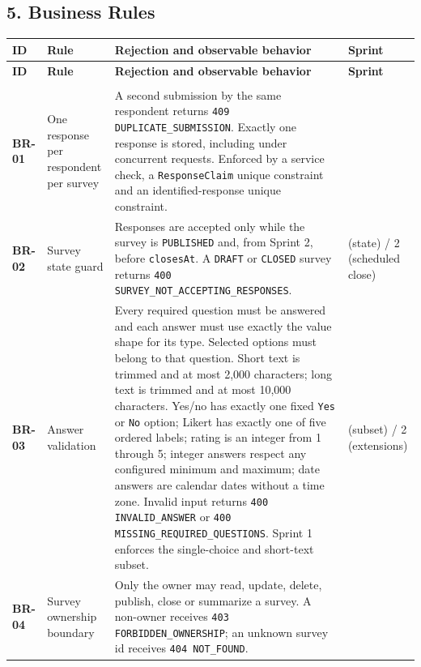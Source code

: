 \documentclass[12pt,a4paper]{article}
\begin{document}
\subsection*{5. Business Rules}
{\setlength{\tabcolsep}{3pt}\renewcommand{\arraystretch}{1.08}\small
\begin{longtable}{@{}>{\raggedright\arraybackslash}p{}>{\raggedright\arraybackslash}p{}>{\raggedright\arraybackslash}p{}>{\raggedright\arraybackslash}p{}@{}}
\toprule
\textbf{ID} & \textbf{Rule} & \textbf{Rejection and observable behavior} & \textbf{Sprint} \\
\midrule
\endfirsthead
\toprule
\textbf{ID} & \textbf{Rule} & \textbf{Rejection and observable behavior} & \textbf{Sprint} \\
\midrule
\endhead
\midrule
\multicolumn{4}{r}{\footnotesize\textit{Continued on next page}}\\
\endfoot
\bottomrule
\endlastfoot
\textbf{BR-01} & One response per respondent per survey & A second submission by the same respondent returns \texttt{409 DUPLICATE\_SUBMISSION}. Exactly one response is stored, including under concurrent requests. Enforced by a service check, a \texttt{ResponseClaim} unique constraint and an identified-response unique constraint. & 1 \\
\textbf{BR-02} & Survey state guard & Responses are accepted only while the survey is \texttt{PUBLISHED} and, from Sprint 2, before \texttt{closesAt}. A \texttt{DRAFT} or \texttt{CLOSED} survey returns \texttt{400 SURVEY\_NOT\_ACCEPTING\_RESPONSES}. & 1 (state) / 2 (scheduled close) \\
\textbf{BR-03} & Answer validation & Every required question must be answered and each answer must use exactly the value shape for its type. Selected options must belong to that question. Short text is trimmed and at most 2,000 characters; long text is trimmed and at most 10,000 characters. Yes/no has exactly one fixed \texttt{Yes} or \texttt{No} option; Likert has exactly one of five ordered labels; rating is an integer from 1 through 5; integer answers respect any configured minimum and maximum; date answers are calendar dates without a time zone. Invalid input returns \texttt{400 INVALID\_ANSWER} or \texttt{400 MISSING\_REQUIRED\_QUESTIONS}. Sprint 1 enforces the single-choice and short-text subset. & 1 (subset) / 2 (extensions) \\
\textbf{BR-04} & Survey ownership boundary & Only the owner may read, update, delete, publish, close or summarize a survey. A non-owner receives \texttt{403 FORBIDDEN\_OWNERSHIP}; an unknown survey id receives \texttt{404 NOT\_FOUND}. & 1 \\

\end{longtable}}
\end{document}
